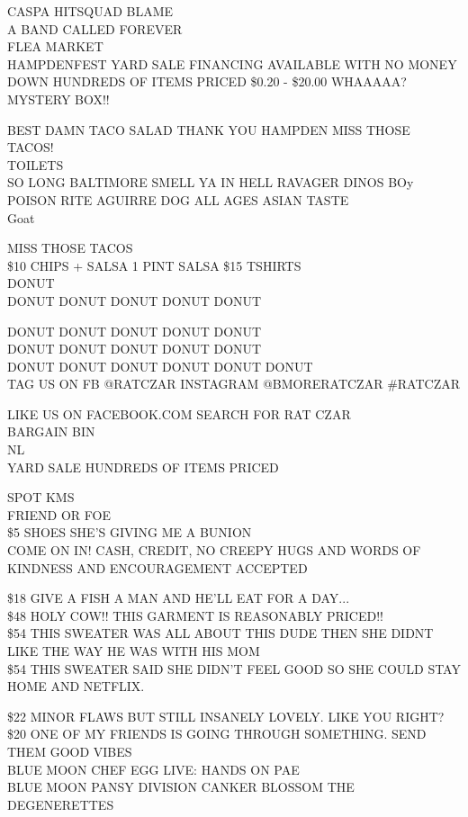\documentclass[10pt,letterpaper]{article}
\begin{document}
CASPA HITSQUAD BLAME\\
A BAND CALLED FOREVER\\
FLEA MARKET\\
HAMPDENFEST YARD SALE FINANCING AVAILABLE WITH NO MONEY DOWN HUNDREDS OF ITEMS PRICED \$0.20 {-} \$20.00 WHAAAAA?  MYSTERY BOX!!

BEST DAMN TACO SALAD THANK YOU HAMPDEN MISS THOSE TACOS!\\
TOILETS\\
SO LONG BALTIMORE SMELL YA IN HELL RAVAGER DINOS BOy POISON RITE AGUIRRE DOG ALL AGES ASIAN TASTE\\
Goat

MISS THOSE TACOS\\
\$10 CHIPS + SALSA 1 PINT SALSA \$15 TSHIRTS\\
DONUT\\
DONUT DONUT DONUT DONUT DONUT

DONUT DONUT DONUT DONUT DONUT\\
DONUT DONUT DONUT DONUT DONUT\\
DONUT DONUT DONUT DONUT DONUT DONUT\\
TAG US ON FB @RATCZAR INSTAGRAM @BMORERATCZAR \#RATCZAR

LIKE US ON FACEBOOK.COM SEARCH FOR RAT CZAR\\
BARGAIN BIN\\
NL\\
YARD SALE HUNDREDS OF ITEMS PRICED

SPOT KMS\\
FRIEND OR FOE\\
\$5 SHOES SHE'S GIVING ME A BUNION\\
COME ON IN!  CASH, CREDIT, NO CREEPY HUGS AND WORDS OF KINDNESS AND ENCOURAGEMENT ACCEPTED

\$18 GIVE A FISH A MAN AND HE'LL EAT FOR A DAY...\\
\$48 HOLY COW!! THIS GARMENT IS REASONABLY PRICED!!\\
\$54 THIS SWEATER WAS ALL ABOUT THIS DUDE THEN SHE DIDNT LIKE THE WAY HE WAS WITH HIS MOM\\
\$54 THIS SWEATER SAID SHE DIDN'T FEEL GOOD SO SHE COULD STAY HOME AND NETFLIX.

\$22 MINOR FLAWS BUT STILL INSANELY LOVELY.  LIKE YOU RIGHT?\\
\$20 ONE OF MY FRIENDS IS GOING THROUGH SOMETHING.  SEND THEM GOOD VIBES\\
BLUE MOON CHEF EGG LIVE: HANDS ON PAE\\
BLUE MOON PANSY DIVISION CANKER BLOSSOM THE DEGENERETTES
\end{document}
